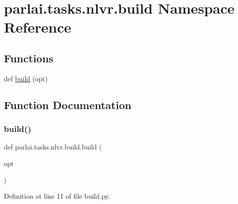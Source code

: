 \hypertarget{namespaceparlai_1_1tasks_1_1nlvr_1_1build}{}\section{parlai.\+tasks.\+nlvr.\+build Namespace Reference}
\label{namespaceparlai_1_1tasks_1_1nlvr_1_1build}
\subsection*{Functions}
\begin{DoxyCompactItemize}
\item 
def \hyperlink{namespaceparlai_1_1tasks_1_1nlvr_1_1build_a2b9db4e1ce7c18cbe126cdaf9ebc7e8a}{build} (opt)
\end{DoxyCompactItemize}


\subsection{Function Documentation}
\mbox{\label{namespaceparlai_1_1tasks_1_1nlvr_1_1build_a2b9db4e1ce7c18cbe126cdaf9ebc7e8a}} 
\subsubsection{\texorpdfstring{build()}{build()}}
{\footnotesize\ttfamily def parlai.\+tasks.\+nlvr.\+build.\+build (\begin{DoxyParamCaption}\item[{}]{opt }\end{DoxyParamCaption})}



Definition at line 11 of file build.\+py.

